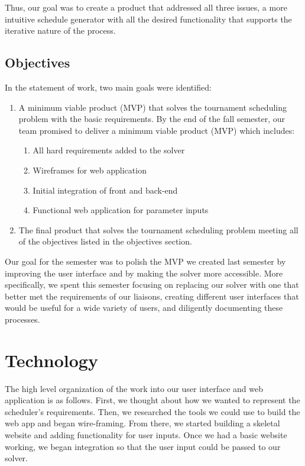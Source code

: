 \documentclass[book]{hmcclinic}
\begin{document}
Thus, our goal was to create a product that addressed all three issues, a more intuitive schedule generator with all the desired functionality that supports the iterative nature of the process.

\section{Objectives}
In the statement of work, two main goals were identified:
\begin{enumerate}
 \item A minimum viable product (MVP) that solves the tournament scheduling problem  with the basic requirements.
  By the end of the fall semester, our team promised to deliver a minimum viable product (MVP) which includes:
 \begin{enumerate}

 \item All hard requirements added to the solver 
 \item Wireframes for web application
 \item Initial integration of front and back-end
 \item Functional web application for parameter inputs
 \end{enumerate}
 \item The final product that solves the tournament scheduling problem meeting all of the objectives listed in the objectives section.

    
\end{enumerate}

Our goal for the semester was to polish the MVP we created last semester by improving the user interface and by making the solver more accessible. More specifically, we spent this semester focusing on replacing our solver with one that better met the requirements of our liaisons, creating different user interfaces that would be useful for a wide variety of users, and diligently documenting these processes.  



\chapter{Technology}

The high level organization of the work into our user interface and web application is as follows. First, we thought about how we wanted to represent the scheduler's requirements. Then, we researched the tools we could use to build the web app and began wire-framing. From there, we started building a skeletal website and adding functionality for user inputs. Once we had a basic website working, we began integration so that the user input could be passed to our solver.
\end{document}
